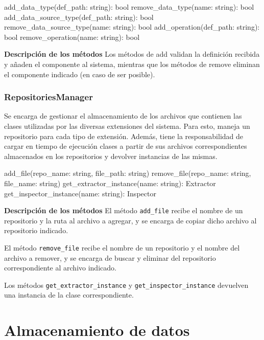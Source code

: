 \begin{python}[title=Interfaz ExtensionsManager, captionpos=b]
add_data_type(def_path: string): bool
remove_data_type(name: string): bool
add_data_source_type(def_path: string): bool
remove_data_source_type(name: string): bool
add_operation(def_path: string): bool
remove_operation(name: string): bool
\end{python}

\textbf{Descripción de los métodos} \newline
Los métodos de add validan la definición recibida y añaden el componente al sistema, mientras que los métodos de remove eliminan el componente indicado (en caso de ser posible).

\subsubsection{RepositoriesManager}
Se encarga de gestionar el almacenamiento de los archivos que contienen las clases utilizadas por las diversas extensiones del sistema. Para esto, maneja un repositorio para cada tipo de extensión. Además, tiene la responsabilidad de cargar en tiempo de ejecución clases a partir de sus archivos correspondientes almacenados en los repositorios y devolver instancias de las mismas.
\newline

\begin{python}[title=Interfaz RepositoriesManager, captionpos=b]
add_file(repo_name: string, file_path: string)
remove_file(repo_name: string, file_name: string)
get_extractor_instance(name: string): Extractor
get_inspector_instance(name: string): Inspector
\end{python}

\textbf{Descripción de los métodos} \newline
El método \texttt{add\_file} recibe el nombre de un repositorio y la ruta al archivo a agregar, y se encarga de copiar dicho archivo al repositorio indicado.

El método \texttt{remove\_file} recibe el nombre de un repositorio y el nombre del archivo a remover, y se encarga de buscar y eliminar del repositorio correspondiente al archivo indicado.

Los métodos \texttt{get\_extractor\_instance} y \texttt{get\_inspector\_instance} devuelven una instancia de la clase correspondiente.

\section{Almacenamiento de datos}
